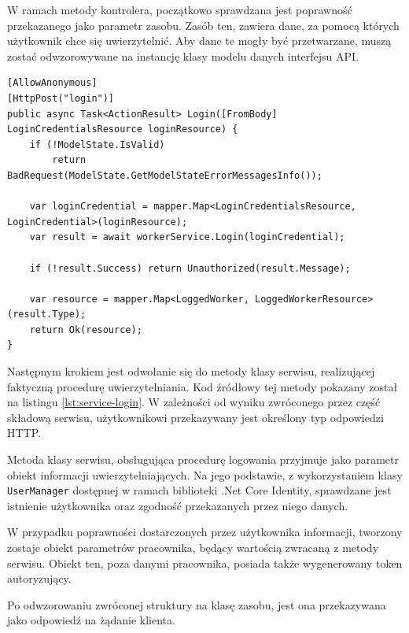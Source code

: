 W ramach metody kontrolera, początkowo sprawdzana jest poprawność przekazanego jako parametr zasobu. Zasób ten, zawiera dane, za pomocą których użytkownik chce się uwierzytelnić. Aby dane te mogły być przetwarzane, muszą zostać odwzorowywane na instancję klasy modelu danych interfejsu API.

\begin{lstlisting}[label=lst:endpoint-login,caption=Kod metody punktu końcowego logowania pracownika, captionpos=b,basicstyle=\footnotesize\ttfamily,style=sharpcstyle,language={[Sharp]C}]
[AllowAnonymous]
[HttpPost("login")]
public async Task<ActionResult> Login([FromBody] LoginCredentialsResource loginResource) {
	if (!ModelState.IsValid)
		return BadRequest(ModelState.GetModelStateErrorMessagesInfo());

	var loginCredential = mapper.Map<LoginCredentialsResource, LoginCredential>(loginResource);
	var result = await workerService.Login(loginCredential);

	if (!result.Success) return Unauthorized(result.Message);

	var resource = mapper.Map<LoggedWorker, LoggedWorkerResource>(result.Type);
	return Ok(resource);
}
\end{lstlisting}

Następnym krokiem jest odwołanie się do metody klasy serwisu, realizującej faktyczną procedurę uwierzytelniania. Kod źródłowy tej metody pokazany został na listingu \ref{lst:service-login}. W zależności od wyniku zwróconego przez część składową serwisu, użytkownikowi przekazywany jest określony typ odpowiedzi HTTP.

Metoda klasy serwisu, obsługująca procedurę logowania przyjmuje jako parametr obiekt informacji uwierzytelniających. Na jego podstawie, z wykorzystaniem klasy \texttt{UserManager} dostępnej w ramach biblioteki .Net Core Identity, sprawdzane jest istnienie użytkownika oraz zgodność przekazanych przez niego danych.

W przypadku poprawności dostarczonych przez użytkownika informacji, tworzony zostaje obiekt parametrów pracownika, będący wartością zwracaną z metody serwisu. Obiekt ten, poza danymi pracownika, posiada także wygenerowany token autoryzujący.

Po odwzorowaniu zwróconej struktury na klasę zasobu, jest ona przekazywana jako odpowiedź na żądanie klienta.

